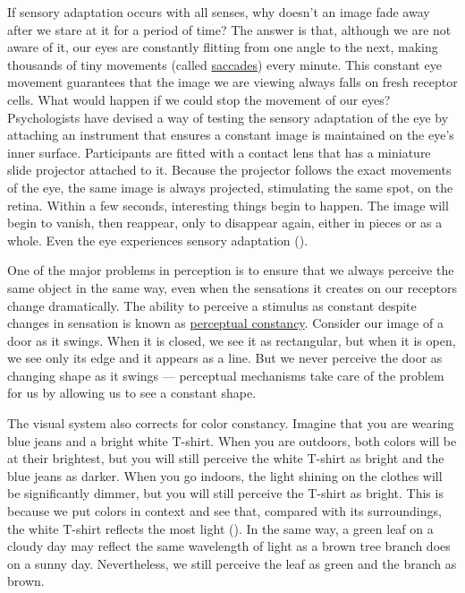 \documentclass[
]{krantz}
\begin{document}
If sensory adaptation occurs with all senses, why doesn't an image fade away after we stare at it for a period of time? The answer is that, although we are not aware of it, our eyes are constantly flitting from one angle to the next, making thousands of tiny movements (called \hyperref[saccades]{saccades}) every minute. This constant eye movement guarantees that the image we are viewing always falls on fresh receptor cells. What would happen if we could stop the movement of our eyes? Psychologists have devised a way of testing the sensory adaptation of the eye by attaching an instrument that ensures a constant image is maintained on the eye's inner surface. Participants are fitted with a contact lens that has a miniature slide projector attached to it. Because the projector follows the exact movements of the eye, the same image is always projected, stimulating the same spot, on the retina. Within a few seconds, interesting things begin to happen. The image will begin to vanish, then reappear, only to disappear again, either in pieces or as a whole. Even the eye experiences sensory adaptation ().

One of the major problems in perception is to ensure that we always perceive the same object in the same way, even when the sensations it creates on our receptors change dramatically. The ability to perceive a stimulus as constant despite changes in sensation is known as \hyperref[perceptual-constancy]{perceptual constancy}. Consider our image of a door as it swings. When it is closed, we see it as rectangular, but when it is open, we see only its edge and it appears as a line. But we never perceive the door as changing shape as it swings --- perceptual mechanisms take care of the problem for us by allowing us to see a constant shape.

The visual system also corrects for color constancy. Imagine that you are wearing blue jeans and a bright white T-shirt. When you are outdoors, both colors will be at their brightest, but you will still perceive the white T-shirt as bright and the blue jeans as darker. When you go indoors, the light shining on the clothes will be significantly dimmer, but you will still perceive the T-shirt as bright. This is because we put colors in context and see that, compared with its surroundings, the white T-shirt reflects the most light (). In the same way, a green leaf on a cloudy day may reflect the same wavelength of light as a brown tree branch does on a sunny day. Nevertheless, we still perceive the leaf as green and the branch as brown.
\end{document}
